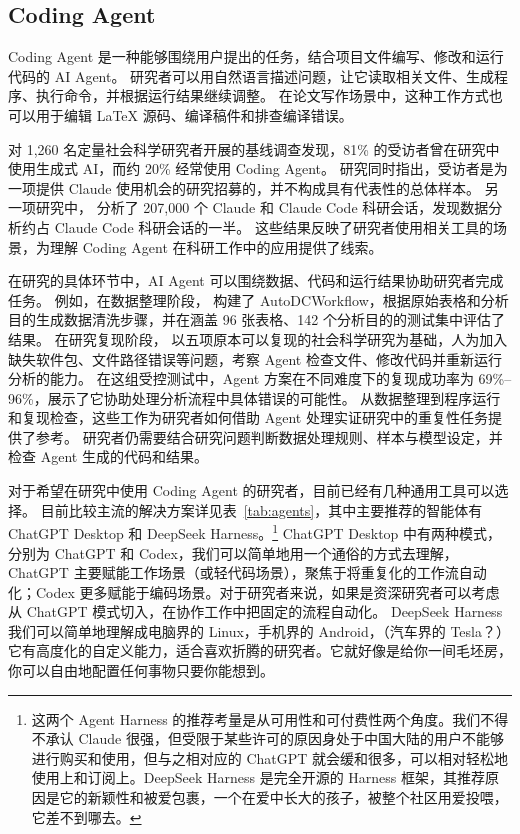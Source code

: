 \subsection{Coding Agent}

Coding Agent 是一种能够围绕用户提出的任务，结合项目文件编写、修改和运行代码的 AI Agent。
研究者可以用自然语言描述问题，让它读取相关文件、生成程序、执行命令，并根据运行结果继续调整。
在论文写作场景中，这种工作方式也可以用于编辑 \LaTeX{} 源码、编译稿件和排查编译错误。

\textcite{lyttelton_coding_agents_2026} 对 1,260 名定量社会科学研究者开展的基线调查发现，81\% 的受访者曾在研究中使用生成式 AI，而约 20\% 经常使用 Coding Agent。
研究同时指出，受访者是为一项提供 Claude 使用机会的研究招募的，并不构成具有代表性的总体样本。
另一项研究中，\textcite{hermle_scientific_discovery_2026} 分析了 207,000 个 Claude 和 Claude Code 科研会话，发现数据分析约占 Claude Code 科研会话的一半。
这些结果反映了研究者使用相关工具的场景，为理解 Coding Agent 在科研工作中的应用提供了线索。

在研究的具体环节中，AI Agent 可以围绕数据、代码和运行结果协助研究者完成任务。
例如，在数据整理阶段，\textcite{li_autodcworkflow_2025} 构建了 AutoDCWorkflow，根据原始表格和分析目的生成数据清洗步骤，并在涵盖 96 张表格、142 个分析目的的测试集中评估了结果。
在研究复现阶段，\textcite{shah_reproducibility_2026} 以五项原本可以复现的社会科学研究为基础，人为加入缺失软件包、文件路径错误等问题，考察 Agent 检查文件、修改代码并重新运行分析的能力。
在这组受控测试中，Agent 方案在不同难度下的复现成功率为 69\%--96\%，展示了它协助处理分析流程中具体错误的可能性。
从数据整理到程序运行和复现检查，这些工作为研究者如何借助 Agent 处理实证研究中的重复性任务提供了参考。
研究者仍需要结合研究问题判断数据处理规则、样本与模型设定，并检查 Agent 生成的代码和结果。

对于希望在研究中使用 Coding Agent 的研究者，目前已经有几种通用工具可以选择。
目前比较主流的解决方案详见表~\ref{tab:agents}，其中主要推荐的智能体有 ChatGPT Desktop 和 DeepSeek Harness。\footnote{这两个 Agent Harness 的推荐考量是从可用性和可付费性两个角度。我们不得不承认 Claude 很强，但受限于某些许可的原因身处于中国大陆的用户不能够进行购买和使用，但与之相对应的 ChatGPT 就会缓和很多，可以相对轻松地使用上和订阅上。DeepSeek Harness 是完全开源的 Harness 框架，其推荐原因是它的新颖性和被爱包裹，一个在爱中长大的孩子，被整个社区用爱投喂，它差不到哪去。}
ChatGPT Desktop 中有两种模式，分别为 ChatGPT 和 Codex，我们可以简单地用一个通俗的方式去理解，ChatGPT 主要赋能工作场景（或轻代码场景），聚焦于将重复化的工作流自动化；Codex 更多赋能于编码场景。对于研究者来说，如果是资深研究者可以考虑从 ChatGPT 模式切入，在协作工作中把固定的流程自动化。
DeepSeek Harness 我们可以简单地理解成电脑界的 Linux，手机界的 Android，（汽车界的 Tesla？）它有高度化的自定义能力，适合喜欢折腾的研究者。它就好像是给你一间毛坯房，你可以自由地配置任何事物只要你能想到。

